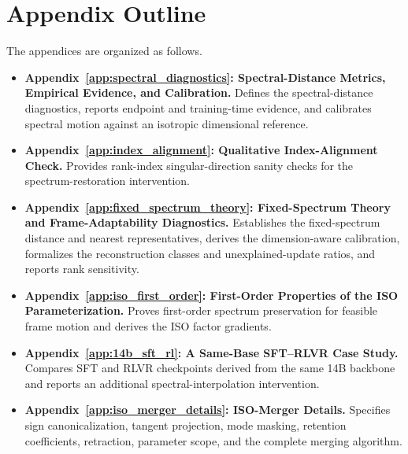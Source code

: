 \documentclass[11pt, a4paper]{utda}
\theoremstyle{plain}
\theoremstyle{definition}
\theoremstyle{remark}
\begin{document}
\appendix

\newpage
\onecolumn
\appendix

\section*{Appendix Outline}




\begingroup
\small
The appendices are organized as follows. 
\begin{itemize}[
    leftmargin=*,
    itemsep=0.5em,
    topsep=0.5em,
    parsep=0pt
]
    \item \textbf{Appendix~\ref{app:spectral_diagnostics}: Spectral-Distance Metrics, Empirical Evidence, and Calibration.} Defines the spectral-distance diagnostics, reports endpoint and training-time evidence, and calibrates spectral motion against an isotropic dimensional reference.

    \item \textbf{Appendix~\ref{app:index_alignment}: Qualitative
    Index-Alignment Check.}
    Provides rank-index singular-direction sanity checks for the
    spectrum-restoration intervention.

    \item \textbf{Appendix~\ref{app:fixed_spectrum_theory}: Fixed-Spectrum
    Theory and Frame-Adaptability Diagnostics.}
    Establishes the fixed-spectrum distance and nearest representatives,
    derives the dimension-aware calibration, formalizes the reconstruction
    classes and unexplained-update ratios, and reports rank sensitivity.

    \item \textbf{Appendix~\ref{app:iso_first_order}: First-Order Properties
    of the ISO Parameterization.}
    Proves first-order spectrum preservation for feasible frame motion and
    derives the ISO factor gradients.

    \item \textbf{Appendix~\ref{app:14b_sft_rl}: A Same-Base SFT--RLVR Case
    Study.}
    Compares SFT and RLVR checkpoints derived from the same 14B backbone and
    reports an additional spectral-interpolation intervention.

    \item \textbf{Appendix~\ref{app:iso_merger_details}: ISO-Merger Details.}
    Specifies sign canonicalization, tangent projection, mode masking,
    retention coefficients, retraction, parameter scope, and the complete
    merging algorithm.


\end{itemize}
\end{document}
